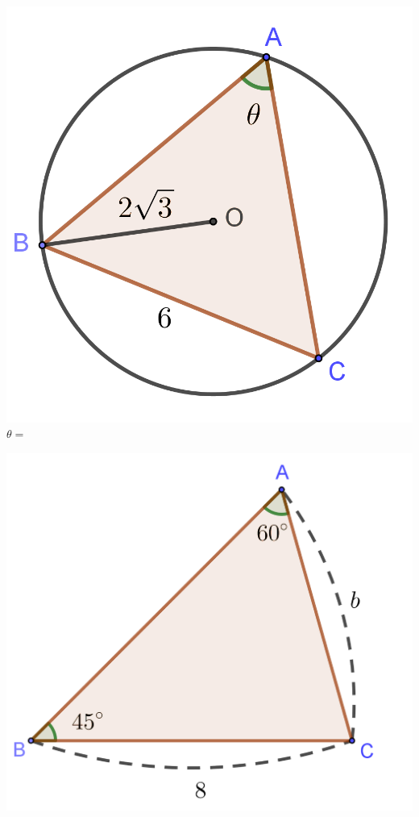 \documentclass{oblivoir}
\begin{document}
\qquad
\begin{minipage}{.2\textwidth}\centering
\includegraphics[width=\textwidth]{sin_4-3}
\\\(\theta=\)
\end{minipage}

\noindent
\begin{minipage}{.6\textwidth}
%
\label{sin5}
\vspace{30pt}
\mbox{}
\end{minipage}
\begin{minipage}{.4\textwidth}
\centering
\includegraphics[width=.6\textwidth]{sin_5}
\end{minipage}
\end{document}
